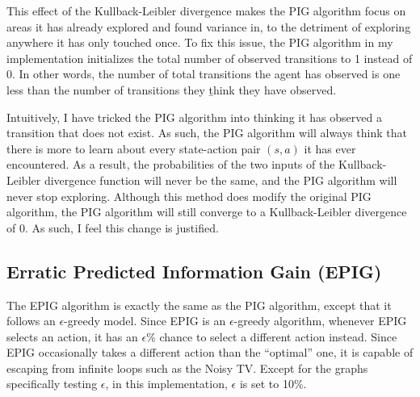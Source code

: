 \documentclass[12pt]{thesis}
\begin{document}
This effect of the Kullback-Leibler divergence makes the PIG algorithm focus on areas it has already explored and found variance in, to the detriment of exploring anywhere it has only touched once. To fix this issue, the PIG algorithm in my implementation initializes the total number of observed transitions to 1 instead of 0. In other words, the number of total transitions the agent has observed is one less than the number of transitions they \b{think} they have observed.

Intuitively, I have tricked the PIG algorithm into thinking it has observed a transition that does not exist. As such, the PIG algorithm will always think that there is more to learn about every state-action pair $(s,a)$ it has ever encountered. As a result, the probabilities of the two inputs of the Kullback-Leibler divergence function will never be the same, and the PIG algorithm will never stop exploring. Although this method does modify the original PIG algorithm, the PIG algorithm will still converge to a Kullback-Leibler divergence of 0. As such, I feel this change is justified.

\subsection{Erratic Predicted Information Gain (EPIG)}
The EPIG algorithm is exactly the same as the PIG algorithm, except that it follows an $\epsilon$-greedy model. Since EPIG is an $\epsilon$-greedy algorithm, whenever EPIG selects an action, it has an $\epsilon$\% chance to select a different action instead. Since EPIG occasionally takes a different action than the ``optimal'' one, it is capable of escaping from infinite loops such as the Noisy TV. Except for the graphs specifically testing $\epsilon$, in this implementation, $\epsilon$ is set to 10\%.
\end{document}
